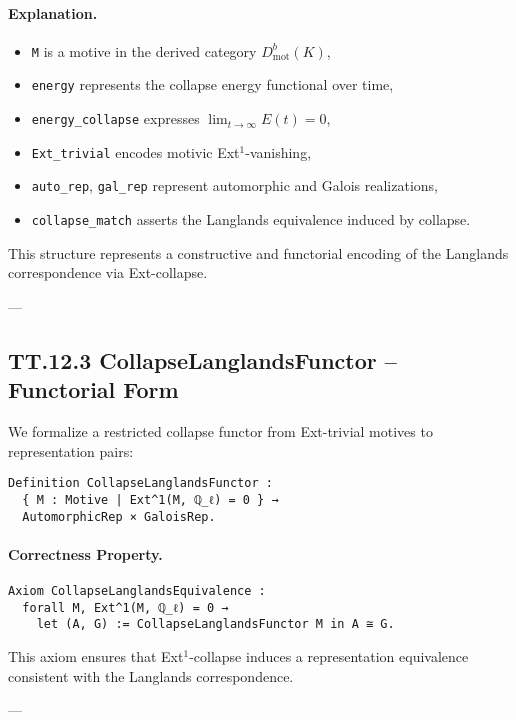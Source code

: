 \documentclass[11pt]{article}
\begin{document}
\paragraph{Explanation.}
\begin{itemize}
  \item \texttt{M} is a motive in the derived category \( D^b_{\mathrm{mot}}(K) \),
  \item \texttt{energy} represents the collapse energy functional over time,
  \item \texttt{energy\_collapse} expresses \( \lim_{t \to \infty} E(t) = 0 \),
  \item \texttt{Ext\_trivial} encodes motivic Ext$^1$-vanishing,
  \item \texttt{auto\_rep}, \texttt{gal\_rep} represent automorphic and Galois realizations,
  \item \texttt{collapse\_match} asserts the Langlands equivalence induced by collapse.
\end{itemize}

This structure represents a constructive and functorial encoding of the Langlands correspondence via Ext-collapse.

---

\subsection*{TT.12.3 CollapseLanglandsFunctor – Functorial Form}

We formalize a restricted collapse functor from Ext-trivial motives to representation pairs:

\begin{verbatim}
Definition CollapseLanglandsFunctor :
  { M : Motive | Ext^1(M, ℚ_ℓ) = 0 } →
  AutomorphicRep × GaloisRep.
\end{verbatim}

\paragraph{Correctness Property.}
\begin{verbatim}
Axiom CollapseLanglandsEquivalence :
  forall M, Ext^1(M, ℚ_ℓ) = 0 →
    let (A, G) := CollapseLanglandsFunctor M in A ≅ G.
\end{verbatim}

This axiom ensures that Ext$^1$-collapse induces a representation equivalence consistent with the Langlands correspondence.

---
\end{document}
